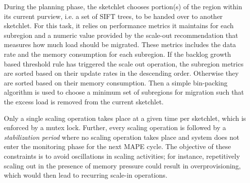 During the planning phase, the sketchlet chooses portion(s) of the region within its current purview, i.e. a set of SIFT trees, to be handed over to another sketchlet.
For this task, it relies on performance metrics it maintains for each subregion and a numeric value provided by the scale-out recommendation that measures how much load should be migrated.
These metrics includes the data rate and the memory consumption for each subregion.
If the backlog growth based threshold rule has triggered the scale out operation, the subregion metrics are sorted based on their update rates in the descending order. Otherwise they are sorted based on their memory consumption.
Then a simple bin-packing algorithm is used to choose a minimum set of subregions for migration such that the excess load is removed from the current sketchlet.

Only a single scaling operation takes place at a given time per sketchlet, which is enforced by a mutex lock.
Further, every scaling operation is followed by a \textit{stabilization period} where no scaling operation takes place and system does not enter the monitoring phase for the next MAPE cycle.
The objective of these constraints is to avoid oscillations in scaling activities; for instance, repetitively scaling out in the presence of memory pressure could result in overprovisioning, which would then lead to recurring scale-in operations.
%


